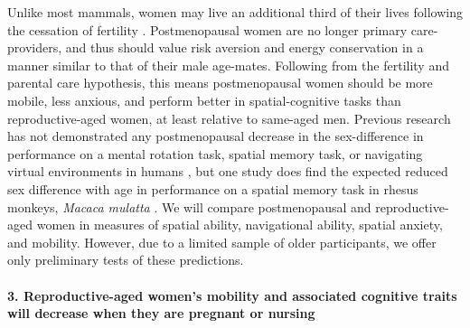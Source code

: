 Unlike most mammals, women may live an additional third of their lives following the cessation of fertility \citep{hawkes2003grandmothers}.  Postmenopausal women are no longer primary care-providers, and thus should value risk aversion and energy conservation in a manner similar to that of their male age-mates.  Following from the fertility and parental care hypothesis, this means postmenopausal women should be more mobile, less anxious, and perform better in spatial-cognitive tasks than reproductive-aged women, at least relative to same-aged men.  Previous research has not demonstrated any postmenopausal decrease in the sex-difference in performance on a mental rotation task, spatial memory task, or navigating virtual environments in humans \citep{willis1988gender, driscoll2005virtual, moffat2001age}, but one study does find the expected reduced sex difference with age in performance on a spatial memory task in rhesus monkeys, \emph{Macaca mulatta} \citep{lacreuse1999spatial}.  We will compare postmenopausal and reproductive-aged women in measures of spatial ability, navigational ability, spatial anxiety, and mobility.  However, due to a limited sample of older participants, we offer only preliminary tests of these predictions.


  
\paragraph{3.  Reproductive-aged women's mobility and associated cognitive traits will decrease when they are pregnant or nursing}\mbox{}\\

